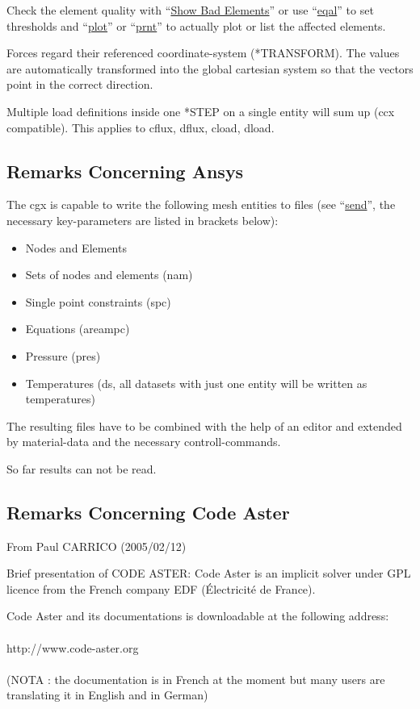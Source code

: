 \documentclass{article}
\providecommand{\htmlref}[2]{\hyperref[#2]{#1}}
\begin{document}
\begin{appendix}
Check the element quality with ``\htmlref{Show Bad Elements}{Show Bad
  Elements}'' or use ``\htmlref{eqal}{eqal}'' to set thresholds and
``\htmlref{plot}{plot}'' or ``\htmlref{prnt}{prnt}'' to actually plot or list the affected elements.

Forces regard their referenced coordinate-system (*TRANSFORM). The values are automatically transformed into the global cartesian system so that the vectors point in the correct direction.

Multiple load definitions inside one *STEP on a single entity will sum up (ccx compatible). This applies to cflux, dflux, cload, dload.

\subsection{\label{Remarks Concerning Ansys}Remarks Concerning Ansys}
The cgx is capable to write the following mesh entities to files (see ``\htmlref{send}{send}'', the necessary key-parameters are listed in brackets below):
\begin{itemize}
\item Nodes and Elements 
\item Sets of nodes and elements (nam)
\item Single point constraints (spc)
\item Equations (areampc)
\item Pressure (pres)
\item Temperatures (ds, all datasets with just one entity will be written as temperatures)
\end{itemize}
The resulting files have to be combined with the help of an editor and extended by material-data and the necessary controll-commands. 

So far results can not be read.

\subsection{\label{Remarks Concerning Code Aster}Remarks Concerning Code Aster}
From Paul CARRICO (2005/02/12)

Brief presentation of CODE ASTER: Code Aster is an implicit  solver under GPL licence from the French company EDF (\'{E}lectricit\'{e} de France).

Code Aster and its documentations is downloadable at the following address:\\\\http://www.code-aster.org\\\\(NOTA : the documentation is in French at the moment but many users are translating it in English and in German)


\end{appendix}
\end{document}

